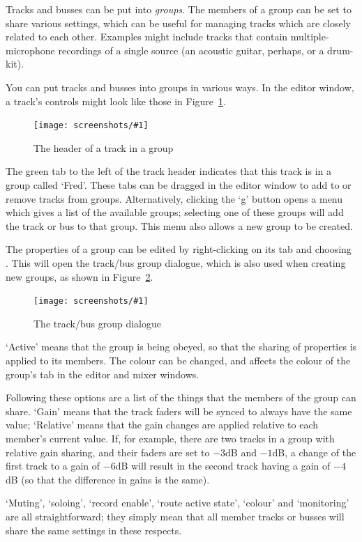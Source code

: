 \documentclass[10pt,a4paper]{book}
\newcommand{\menu}[1]{\emph{\StrSubstitute{#1}{,}{ $\rightarrow$ }}}
\newcommand{\screenshot}[3]{%
\begin{figure}[ht]%
\begin{center}
\texttt{[image: screenshots/\#1]}
\end{center}
\caption{#2}
\label{#3}
\end{figure}}
\begin{document}
{Tracks and busses can be put into \emph{groups}. The members of a
group can be set to share various settings, which can be useful for
managing tracks which are closely related to each other.  Examples
might include tracks that contain multiple-microphone recordings of a
single source (an acoustic guitar, perhaps, or a drum-kit).

You can put tracks and busses into groups in various ways.  In the
editor window, a track's controls might look like those in
Figure~\ref{fig:track-in-group}.

\screenshot{track-in-group.png}{The header of a track in a group}{fig:track-in-group}

The green tab to the left of the track header indicates that this
track is in a group called `Fred'.  These tabs can be dragged in the
editor window to add to or remove tracks from groups.  Alternatively,
clicking the `g' button opens a menu which gives a list of the
available groups; selecting one of these groups will add the track or
bus to that group.  This menu also allows a new group to be created.

The properties of a group can be edited by right-clicking on its tab
and choosing \menu{Edit Group...}.  This will open the track/bus group
dialogue, which is also used when creating new groups, as shown in
Figure~\ref{fig:route-group-dialogue}.

\screenshot{route-group-dialogue.png}{The track/bus group dialogue}{fig:route-group-dialogue}

`Active' means that the group is being obeyed, so that the sharing of
properties is applied to its members.  The colour can be changed, and
affects the colour of the group's tab in the editor and mixer windows.

Following these options are a list of the things that the members of
the group can share.  `Gain' means that the track faders will be
synced to always have the same value; `Relative' means that the gain
changes are applied relative to each member's current value.  If, for
example, there are two tracks in a group with relative gain sharing,
and their faders are set to $-3$dB and $-1$dB, a change of the first
track to a gain of $-6$dB will result in the second track having a
gain of $-4$dB (so that the difference in gains is the same).

`Muting', `soloing', `record enable', `route active state', `colour'
and `monitoring' are all straightforward; they simply mean that all
member tracks or busses will share the same settings in these
respects.

}
\end{document}
